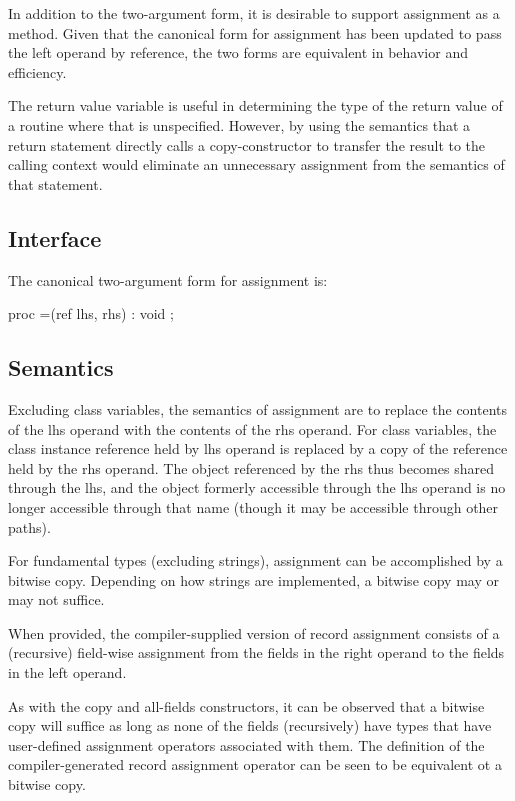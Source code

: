 \begin{future}

In addition to the two-argument form, it is desirable to support assignment as a
method.  Given that the canonical form for assignment has been updated to pass
the left operand by reference, the two forms are equivalent in behavior and
efficiency.

The return value variable is useful in determining the type of the return value
of a routine where that is unspecified.  However, by using the semantics that a
return statement directly calls a copy-constructor to transfer the result to the
calling context would eliminate an unnecessary assignment from the semantics of
that statement.

\end{future}

\subsection{Interface}

The canonical two-argument form for assignment is:
\begin{chapel}
proc =(ref lhs, rhs) : void ;
\end{chapel}

\subsection{Semantics}

Excluding class variables, the semantics of assignment are to replace the
contents of the lhs operand with the contents of the rhs operand.  For class
variables, the class instance reference held by lhs operand is replaced by a
copy of the reference held by the rhs operand.  The object referenced by the rhs
thus becomes shared through the lhs, and the object formerly accessible through
the lhs operand is no longer accessible through that name (though it may be
accessible through other paths).

For fundamental types (excluding strings),
assignment can be accomplished by a bitwise copy.  
Depending on how strings are implemented, a bitwise copy may or may not suffice.

When provided, the compiler-supplied version of record assignment consists of a
(recursive) field-wise assignment from the fields in the right operand to the
fields in the left operand.

\begin{note}

As with the copy and all-fields constructors, it can be observed that a bitwise
copy will suffice as long as none of the fields (recursively) have types that
have user-defined assignment operators associated with them.  The definition of
the compiler-generated record assignment operator can be seen to be equivalent
ot a bitwise copy.

\end{note}

